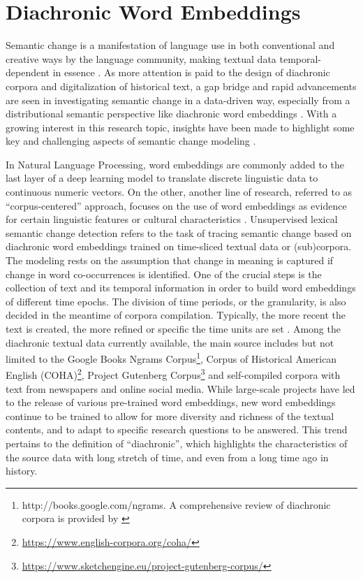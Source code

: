 \section{Diachronic Word Embeddings}
Semantic change is a manifestation of language use in both conventional and creative ways by the language community, making textual data temporal-dependent in essence \parencite{kutuzov2018survey}. As more attention is paid to the design of diachronic corpora and digitalization of historical text, a gap bridge and rapid advancements are seen in investigating semantic change in a data-driven way, especially from a distributional semantic perspective like diachronic word embeddings \parencite{kutuzov2018survey, tahmasebi2018survey, hamilton2016law}. With a growing interest in this research topic, insights have been made to highlight some key and challenging aspects of semantic change modeling \parencite{kutuzov2018survey,tahmasebi2018survey,camacho2018survey}. 

In Natural Language Processing, word embeddings are commonly added to the last layer of a deep learning model to translate discrete linguistic data to continuous numeric vectors. On the other, another line of research, referred to as ``corpus-centered'' approach, focuses on the use of word embeddings as evidence for certain linguistic features or cultural characteristics \parencite{antoniak2018evaluating}. Unsupervised lexical semantic change detection refers to the task of tracing semantic change based on diachronic word embeddings trained on time-sliced textual data or (sub)corpora. The modeling rests on the assumption that change in meaning is captured if change in word co-occurrences is identified. One of the crucial steps is the collection of text and its temporal information in order to build word embeddings of different time epochs. The division of time periods, or the granularity, is also decided in the meantime of corpora compilation. Typically, the more recent the text is created, the more refined or specific the time units are set \parencite{kutuzov2018survey}. Among the diachronic textual data currently available, the main source includes but not limited to the Google Books Ngrams Corpus\footnote{http://books.google.com/ngrams. A comprehensive review of diachronic corpora is provided by \textcite[38--41]{tahmasebi2018survey}}, Corpus of Historical American English (COHA)\footnote{\url{https://www.english-corpora.org/coha/}}, Project Gutenberg Corpus\footnote{\url{https://www.sketchengine.eu/project-gutenberg-corpus/}} and self-compiled corpora with text from newspapers and online social media. While large-scale projects have led to the release of various pre-trained word embeddings, new word embeddings continue to be trained to allow for more diversity and richness of the textual contents, and to adapt to specific research questions to be answered. This trend pertains to the definition of ``diachronic'', which highlights the characteristics of the source data with long stretch of time, and even from a long time ago in history.

